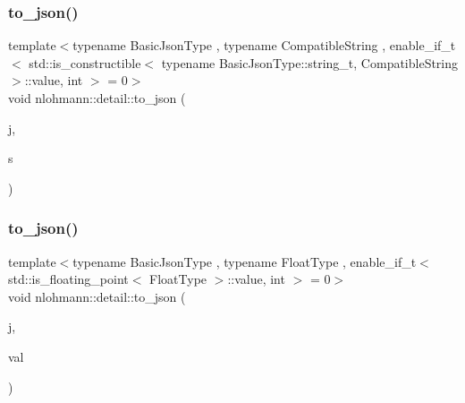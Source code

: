 \mbox{\label{namespacenlohmann_1_1detail_a7356ed05cdbbb080cee80e1211e1c6c9}} 
\subsubsection{\texorpdfstring{to\_json()}{to\_json()}\hspace{0.1cm}{\footnotesize\ttfamily [2/8]}}
{\footnotesize\ttfamily template$<$typename Basic\+Json\+Type , typename Compatible\+String , enable\+\_\+if\+\_\+t$<$ std\+::is\+\_\+constructible$<$ typename Basic\+Json\+Type\+::string\+\_\+t, Compatible\+String $>$\+::value, int $>$  = 0$>$ \\
void nlohmann\+::detail\+::to\+\_\+json (\begin{DoxyParamCaption}\item[{Basic\+Json\+Type \&}]{j,  }\item[{const Compatible\+String \&}]{s }\end{DoxyParamCaption})}

\mbox{\label{namespacenlohmann_1_1detail_a22bffdc8bc7e43af380ba2050696b230}} 
\subsubsection{\texorpdfstring{to\_json()}{to\_json()}\hspace{0.1cm}{\footnotesize\ttfamily [3/8]}}
{\footnotesize\ttfamily template$<$typename Basic\+Json\+Type , typename Float\+Type , enable\+\_\+if\+\_\+t$<$ std\+::is\+\_\+floating\+\_\+point$<$ Float\+Type $>$\+::value, int $>$  = 0$>$ \\
void nlohmann\+::detail\+::to\+\_\+json (\begin{DoxyParamCaption}\item[{Basic\+Json\+Type \&}]{j,  }\item[{Float\+Type}]{val }\end{DoxyParamCaption})\hspace{0.3cm}{\ttfamily [noexcept]}}

\mbox{\label{namespacenlohmann_1_1detail_ae5fd66b5517b3b5a6c6b9fd9f29ba8dc}} 
